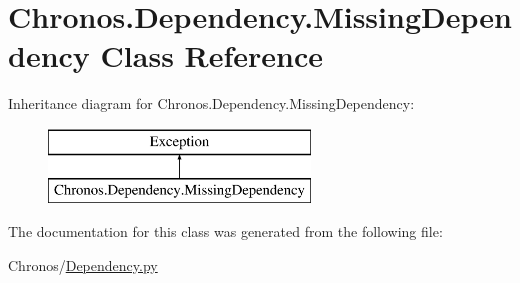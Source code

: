 \hypertarget{classChronos_1_1Dependency_1_1MissingDependency}{}\section{Chronos.\+Dependency.\+Missing\+Dependency Class Reference}
\label{classChronos_1_1Dependency_1_1MissingDependency}
Inheritance diagram for Chronos.\+Dependency.\+Missing\+Dependency\+:\begin{figure}[H]
\begin{center}
\leavevmode
\includegraphics[height=2.000000cm]{classChronos_1_1Dependency_1_1MissingDependency}
\end{center}
\end{figure}


The documentation for this class was generated from the following file\+:\begin{DoxyCompactItemize}
\item 
Chronos/\hyperlink{Dependency_8py}{Dependency.\+py}\end{DoxyCompactItemize}
